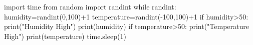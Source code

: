  import time
from random import randint
while randint:
    humidity=randint(0,100)+1
    temperature=randint(-100,100)+1
    if humidity>50:
        print("\n \n Humidity High")
        print(humidity)
    if temperature>50:
       print("Temperature High")
       print(temperature)
    time.sleep(1) 